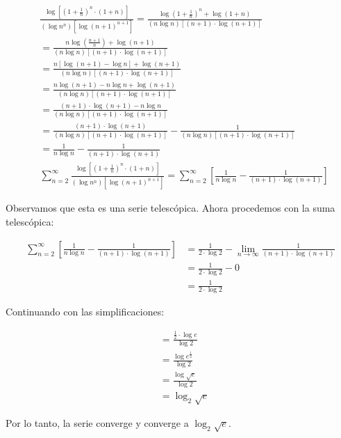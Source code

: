 \documentclass{article}
\begin{document}
    \begin{align*}
    & \frac{\log \left[\left(1+\frac{1}{n}\right)^{n} \cdot(1+n)\right]}{\left(\log n^{n}\right)\left[\log (n+1)^{n+1}\right]} = \frac{\log \left(1+\frac{1}{n}\right)^{n}+\log (1+n)}{(n \log n)[(n+1) \cdot \log (n+1)]} \\
    & =\frac{n \log \left(\frac{n+1}{n}\right)+\log (n+1)}{(n \log n)[(n+1) \cdot \log (n+1)]} \\
    & =\frac{n[\log (n+1)-\log n]+\log (n+1)}{(n \log n)[(n+1) \cdot \log (n+1)]} \\
    & =\frac{n \log (n+1)-n \log n+\log (n+1)}{(n \log n)[(n+1) \cdot \log (n+1)]} \\
    & =\frac{(n+1) \cdot \log (n+1)-n \log n}{(n \log n)[(n+1) \cdot \log (n+1)]} \\
    & =\frac{(n+1) \cdot \log (n+1)}{(n \log n)[(n+1) \cdot \log (n+1)]}-\frac{1}{(n \log n)[(n+1) \cdot \log (n+1)]} \\
    & =\frac{1}{n \log n}-\frac{1}{(n+1) \cdot \log (n+1)} \\
    & \sum_{n=2}^{\infty} \frac{\log \left[\left(1+\frac{1}{n}\right)^{n} \cdot(1+n)\right]}{\left(\log n^{n}\right)\left[\log (n+1)^{n+1}\right]} = \sum_{n=2}^{\infty}\left[\frac{1}{n \log n}-\frac{1}{(n+1) \cdot \log (n+1)}\right]
    \end{align*}

    Observamos que esta es una serie telescópica. Ahora procedemos con la suma telescópica:

    \begin{align*}
    \sum_{n=2}^{\infty}\left[\frac{1}{n \log n}-\frac{1}{(n+1) \cdot \log (n+1)}\right] & =\frac{1}{2 \cdot \log 2}-\lim _{n \rightarrow \infty} \frac{1}{(n+1) \cdot \log (n+1)} \\
    & =\frac{1}{2 \cdot \log 2}-0 \\
    & =\frac{1}{2 \cdot \log 2}
    \end{align*}

    Continuando con las simplificaciones:

    \begin{align*}
    & =\frac{\frac{1}{2} \cdot \log e}{\log 2} \\
    & =\frac{\log e^{\frac{1}{2}}}{\log 2} \\
    & =\frac{\log \sqrt{e}}{\log 2} \\
    & =\log _{2} \sqrt{e}
    \end{align*}

    Por lo tanto, la serie converge y converge a $\log _{2} \sqrt{e}$.
\end{document}

